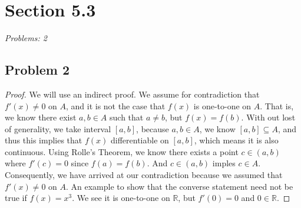 \documentclass[12pt]{article}
\begin{document}
\vspace*{1cm}


\section*{Section 5.3}
\textit{Problems: 2}
\subsection*{Problem 2}
\begin{proof}
We will use an indirect proof. 
We assume for contradiction that $f'(x) \ne 0$ on $A$, and it is not the case that $f(x)$ is one-to-one on $A$. 
That is, we know there exist $a, b \in A$ such that $a \ne b$, but $f(x) = f(b)$. 
With out lost of generality, we take interval $[a,b]$, because $a, b \in A$, we know $[a,b] \subseteq A$, and thus this implies that $f(x)$ differentiable on $[a,b]$, which means it is also continuous. 
Using Rolle's Theorem, we know there exists a point $c \in (a,b)$ where $f'(c) = 0$ since $f(a) = f(b)$. 
And $c \in (a,b)$ imples $c \in A$.
Consequently, we have arrived at our contradiction because we assumed that $f'(x) \ne 0$ on $A$. 
An example to show that the converse statement need not be true if $f(x) = x^3$.
We see it is one-to-one on $\mathbb{R}$, but $f'(0) = 0$ and $0 \in \mathbb{R}$. 
\end{proof}
\end{document}
